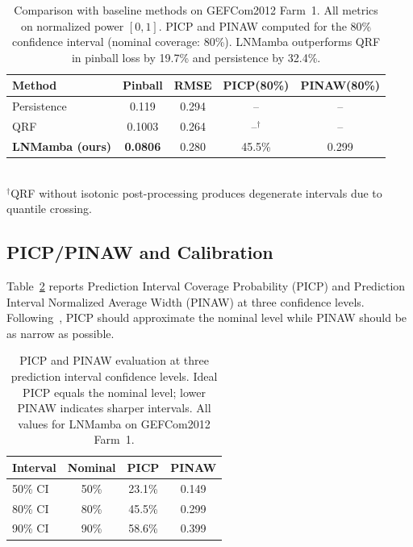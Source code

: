 \documentclass[review]{elsarticle}
\begin{document}
\begin{table}[H]
\centering
\caption{Comparison with baseline methods on GEFCom2012 Farm~1. All metrics on normalized power $[0,1]$. PICP and PINAW computed for the 80\% confidence interval (nominal coverage: 80\%). LNMamba outperforms QRF in pinball loss by 19.7\% and persistence by 32.4\%.}
\label{tab:sota}
\begin{tabular}{@{}lcccc@{}}
\toprule
\textbf{Method} & \textbf{Pinball} & \textbf{RMSE} & \textbf{PICP(80\%)} & \textbf{PINAW(80\%)} \\
\midrule
Persistence & 0.119 & 0.294 & -- & -- \\
QRF~\cite{meinshausen2006quantile} & 0.1003 & 0.264 & --$^\dagger$ & -- \\
\textbf{LNMamba (ours)} & \textbf{0.0806} & 0.280 & 45.5\% & 0.299 \\
\bottomrule
\end{tabular}\\
\footnotesize{$^\dagger$QRF without isotonic post-processing produces degenerate intervals due to quantile crossing.}
\end{table}

\subsection{PICP/PINAW and Calibration}

Table~\ref{tab:picp} reports Prediction Interval Coverage Probability (PICP) and Prediction Interval Normalized Average Width (PINAW) at three confidence levels. Following~\cite{khosravi2011comprehensive}, PICP should approximate the nominal level while PINAW should be as narrow as possible.

\begin{table}[H]
\centering
\caption{PICP and PINAW evaluation at three prediction interval confidence levels. Ideal PICP equals the nominal level; lower PINAW indicates sharper intervals. All values for LNMamba on GEFCom2012 Farm~1.}
\label{tab:picp}
\begin{tabular}{@{}lccc@{}}
\toprule
\textbf{Interval} & \textbf{Nominal} & \textbf{PICP} & \textbf{PINAW} \\
\midrule
50\% CI & 50\% & 23.1\% & 0.149 \\
80\% CI & 80\% & 45.5\% & 0.299 \\
90\% CI & 90\% & 58.6\% & 0.399 \\
\bottomrule
\end{tabular}
\end{table}
\end{document}
